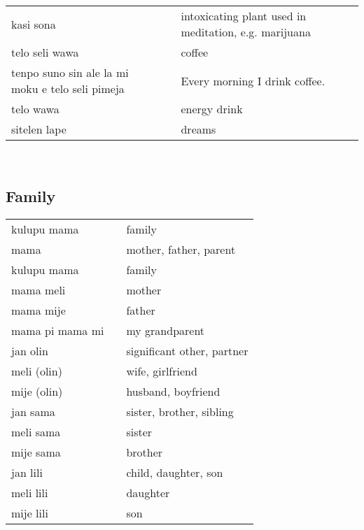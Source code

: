 \begin{supertabular}{p{4,5cm}|ll}
    kasi sona                                        &  & intoxicating plant used in meditation, e.g. marijuana \\
    telo seli wawa                                   &  & coffee                                                \\
    tenpo suno sin ale la mi moku e telo seli pimeja &  & Every morning I drink coffee.                         \\
    telo wawa                                        &  & energy drink                                          \\
    sitelen lape                                     &  & dreams                                                \\
\end{supertabular} \\
%
%
\subsection{Family}
%
\begin{supertabular}{p{4,5cm}|ll}
    kulupu mama     &  & family                     \\
    mama            &  & mother, father, parent     \\
    kulupu mama     &  & family                     \\
    mama meli       &  & mother                     \\
    mama mije       &  & father                     \\
    mama pi mama mi &  & my grandparent             \\
    jan olin        &  & significant other, partner \\
    meli (olin)     &  & wife, girlfriend           \\
    mije (olin)     &  & husband, boyfriend         \\
    jan sama        &  & sister, brother, sibling   \\
    meli sama       &  & sister                     \\
    mije sama       &  & brother                    \\
    jan lili        &  & child, daughter, son       \\
    meli lili       &  & daughter                   \\
    mije lili       &  & son                        \\
\end{supertabular} \\
%
%
